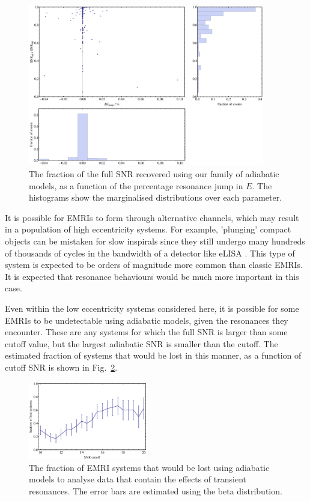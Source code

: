 \documentclass[aps,prd,amsfonts,amssymb,amsmath,nofootinbib,reprint,showpacs]{revtex4}
\newcommand{\figref}[1]{Fig.\ \ref{fig:#1}}
\begin{document}
\begin{figure}[htbp]
\centering
\includegraphics[width=0.92\textwidth]{Fig_pop_SNR_vs_jump}
\caption{\label{fig:pop-SNR-vs-jump}The fraction of the full SNR recovered using our family of adiabatic models, as a function of the percentage resonance jump in $E$. The histograms show the marginalised distributions over each parameter.}
\end{figure}

It is possible for EMRIs to form through alternative channels, which may result in a population of high eccentricity systems. For example, 'plunging' compact objects can be mistaken for slow inspirals since they still undergo many hundreds of thousands of cycles in the bandwidth of a detector like eLISA \cite{Amaro-Seoane2013}. This type of system is expected to be orders of magnitude more common than classic EMRIs. It is expected that resonance behaviours would be much more important in this case.

Even within the low eccentricity systems considered here, it is possible for some EMRIs to be undetectable using adiabatic models, given the resonances they encounter. These are any systems for which the full SNR is larger than some cutoff value, but the largest adiabatic SNR is smaller than the cutoff. The estimated fraction of systems that would be lost in this manner, as a function of cutoff SNR is shown in \figref{SNRcutoff}.

\begin{figure}[htbp]
\centering
\includegraphics[width=0.46\textwidth]{Fig_SNRcutoff}
\caption{\label{fig:SNRcutoff}The fraction of EMRI systems that would be lost using adiabatic models to analyse data that contain the effects of transient resonances. The error bars are estimated using the beta distribution.}
\end{figure}
\end{document}
